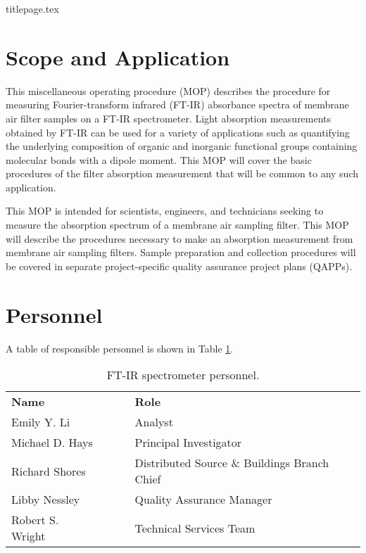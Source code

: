 \documentclass[12pt]{article}
\newcommand*{\sectiondir}{sections/}
\begin{document}
{titlepage.tex}
\tableofcontents \newpage

\section{Scope and Application}
This miscellaneous operating procedure (MOP) describes the procedure for measuring Fourier-transform infrared (FT-IR) absorbance spectra of membrane air filter samples on a FT-IR spectrometer. Light absorption measurements obtained by FT-IR can be used for a variety of applications such as quantifying the underlying composition of organic and inorganic functional groups containing molecular bonds with a dipole moment. This MOP will cover the basic procedures of the filter absorption measurement that will be common to any such application.

This MOP is intended for scientists, engineers, and technicians seeking to measure the absorption spectrum of a membrane air sampling filter. This MOP will describe the procedures necessary to make an absorption measurement from membrane air sampling filters. Sample preparation and collection procedures will be covered in separate project-specific quality assurance project plans (QAPPs).

\section{Personnel}
A table of responsible personnel is shown in Table \ref{tab:personnel}.

\begin{table}[H]
    \centering
    \begin{tabular}{l l}
         \textbf{Name} & \textbf{Role} \\
         Emily Y. Li & Analyst \\
         Michael D. Hays & Principal Investigator \\
         Richard Shores & Distributed Source \& Buildings Branch Chief\\
         Libby Nessley & Quality Assurance Manager \\
         Robert S. Wright~~~~~ & Technical Services Team \\ %
    \end{tabular}
    \caption{FT-IR spectrometer personnel.}
    \label{tab:personnel}
\end{table}
\end{document}
